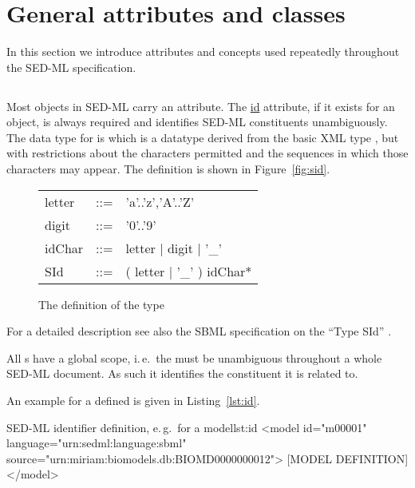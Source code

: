 \section{General attributes and classes}
In this section we introduce attributes and concepts used repeatedly throughout the SED-ML specification. 


\subsection{}
\label{sec:id}

Most objects in SED-ML carry an  attribute. The \hyperref[sec:id]{id} attribute, if it exists for an object, is always required and identifies SED-ML constituents unambiguously. The data type for  is  which is a datatype derived from the basic XML type , but with restrictions about the characters permitted and the sequences in which those characters may appear. The definition is shown in Figure~\vref{fig:sid}.

\begin{figure}[hbt]
  \ttfamily
  \small
  \centering
  \begin{tabular}{lll}
    letter & ::= & 'a'..'z','A'..'Z'\\
    digit  & ::= & '0'..'9'\\
    idChar & ::= & letter | digit | '\_'\\
    SId    & ::= & ( letter | '\_' ) idChar*\\
  \end{tabular}
  \vspace*{-1ex}
  \caption{The definition of the type }
  \label{fig:sid}
\end{figure}

For a detailed description see also the SBML specification on the ``Type SId'' \citep[p. 11]{HBH+10}.

All s have a global scope, i.\,e.\ the  must be unambiguous throughout a whole SED-ML document. As such it identifies the constituent it is related to.

An example for a defined  is given in Listing~\ref{lst:id}.

\begin{myXmlLst}{SED-ML identifier definition, e.\,g.\ for a model}{lst:id}
<model id="m00001" language="urn:sedml:language:sbml" source="urn:miriam:biomodels.db:BIOMD0000000012">
 [MODEL DEFINITION]
</model>
\end{myXmlLst}

